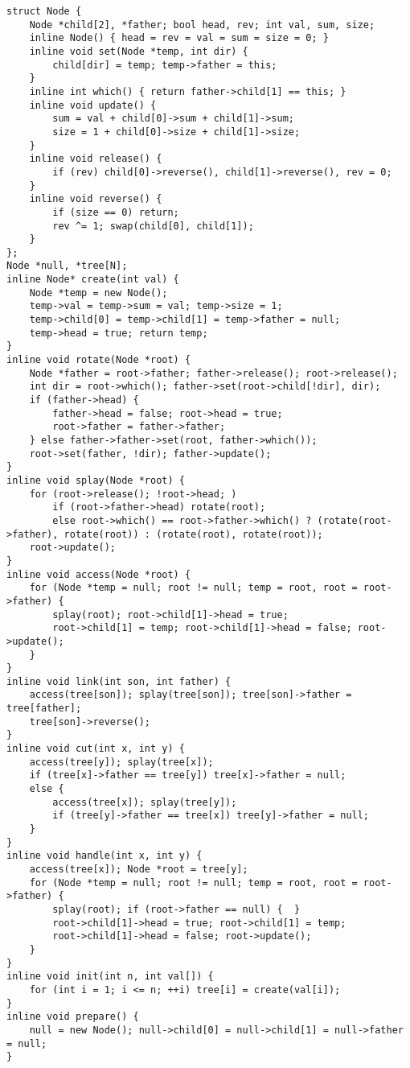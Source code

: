 \begin{lstlisting}
struct Node {
	Node *child[2], *father; bool head, rev; int val, sum, size;
	inline Node() { head = rev = val = sum = size = 0; }
	inline void set(Node *temp, int dir) {
		child[dir] = temp; temp->father = this;
	}
	inline int which() { return father->child[1] == this; }
	inline void update() {
		sum = val + child[0]->sum + child[1]->sum;
		size = 1 + child[0]->size + child[1]->size;
	}
	inline void release() {
		if (rev) child[0]->reverse(), child[1]->reverse(), rev = 0;
	}
	inline void reverse() {
		if (size == 0) return;
		rev ^= 1; swap(child[0], child[1]);
	}
};
Node *null, *tree[N];
inline Node* create(int val) {
	Node *temp = new Node();
	temp->val = temp->sum = val; temp->size = 1;
	temp->child[0] = temp->child[1] = temp->father = null;
	temp->head = true; return temp;
}
inline void rotate(Node *root) {
	Node *father = root->father; father->release(); root->release();
	int dir = root->which(); father->set(root->child[!dir], dir);
	if (father->head) {
		father->head = false; root->head = true;
		root->father = father->father;
	} else father->father->set(root, father->which());
	root->set(father, !dir); father->update();
}
inline void splay(Node *root) {
	for (root->release(); !root->head; )
		if (root->father->head) rotate(root);
		else root->which() == root->father->which() ? (rotate(root->father), rotate(root)) : (rotate(root), rotate(root));
	root->update();
}
inline void access(Node *root) {
	for (Node *temp = null; root != null; temp = root, root = root->father) {
		splay(root); root->child[1]->head = true;
		root->child[1] = temp; root->child[1]->head = false; root->update();
	}
}
inline void link(int son, int father) {
	access(tree[son]); splay(tree[son]); tree[son]->father = tree[father];
	tree[son]->reverse();
}
inline void cut(int x, int y) {
	access(tree[y]); splay(tree[x]);
	if (tree[x]->father == tree[y]) tree[x]->father = null;
	else {
		access(tree[x]); splay(tree[y]);
		if (tree[y]->father == tree[x]) tree[y]->father = null;
	}
}
inline void handle(int x, int y) {
	access(tree[x]); Node *root = tree[y];
	for (Node *temp = null; root != null; temp = root, root = root->father) {
		splay(root); if (root->father == null) {  }
		root->child[1]->head = true; root->child[1] = temp;
		root->child[1]->head = false; root->update();
	}
}
inline void init(int n, int val[]) {
	for (int i = 1; i <= n; ++i) tree[i] = create(val[i]);
}
inline void prepare() {
	null = new Node(); null->child[0] = null->child[1] = null->father = null;
}
\end{lstlisting}